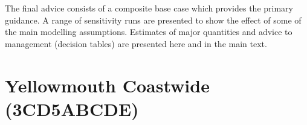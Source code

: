\documentclass[11pt]{book}
\begin{document}
The final advice consists of a composite base case which provides the primary guidance.
A range of sensitivity runs are presented to show the effect of some of the main modelling assumptions.
Estimates of major quantities and advice to management (decision tables) are presented here and in the main text.




\newcommand{\nSims}{4000}
\newcommand{\nChains}{8}
\newcommand{\cSims}{500}
\newcommand{\cBurn}{250}
\newcommand{\cSamps}{250}
\newcommand{\Nmcmc}{2000}
\newcommand{\Nbase}{10,000}

\section{Yellowmouth Coastwide (3CD5ABCDE)}



\renewcommand{\startYear}{1935} %
\renewcommand{\currYear}{2022}   %
\renewcommand{\prevYear}{2021}   %
\renewcommand{\projYear}{2032}   %
\renewcommand{\pgenYear}{2112}   %
\end{document}
